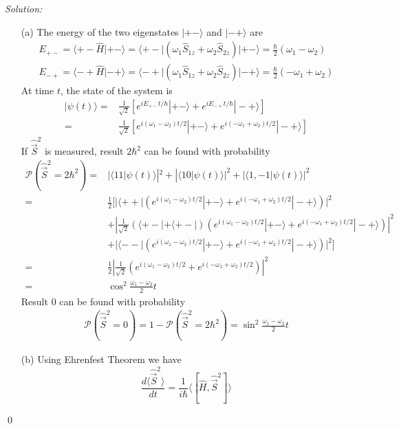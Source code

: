 \documentclass[10pt,a4paper]{article}
\newenvironment{sol}
    {\emph{Solution:}
    }
    {
    \qed
    }
\begin{document}
\begin{sol}
\begin{itemize}
\item[(a)] The energy of the two eigenstates $|+-\rangle$ and $|-+\rangle$ are
\begin{gather}
E_{+-}=\langle+-\hat{H}|+-\rangle=\langle+-|(\omega_1\hat{S}_{1z}+\omega_2\hat{S}_{2z})|+-\rangle=\frac{\hbar}{2}(\omega_1-\omega_2)\\
E_{-+}=\langle-+\hat{H}|-+\rangle=\langle-+|(\omega_1\hat{S}_{1z}+\omega_2\hat{S}_{2z})|-+\rangle=\frac{\hbar}{2}(-\omega_1+\omega_2)
\end{gather}
At time $t$, the state of the system is
\begin{align}
\nonumber|\psi(t)\rangle=&\frac{1}{\sqrt{2}}[e^{iE_{+-}t/\hbar}|+-\rangle+e^{iE_{-+}t/\hbar}|-+\rangle]\\
=&\frac{1}{\sqrt{2}}[e^{i(\omega_1-\omega_2)t/2}|+-\rangle+e^{i(-\omega_1+\omega_2)t/2}|-+\rangle]
\end{align}
If $\hat{\vec{S}}^2$ is measured, result $2\hbar^2$ can be found with probability
\begin{align}
\nonumber\mathscr{P}(\hat{\vec{S}}^2=2\hbar^2)=&|\langle11|\psi(t)\rangle|^2+|\langle10|\psi(t)\rangle|^2+|\langle1,-1|\psi(t)\rangle|^2\\
\nonumber=&\frac{1}{2}[|\langle++|(e^{i(\omega_1-\omega_2)t/2}|+-\rangle+e^{i(-\omega_1+\omega_2)t/2}|-+\rangle)|^2\\
\nonumber&+|\frac{1}{\sqrt{2}}(\langle+-|+\langle+-|)(e^{i(\omega_1-\omega_2)t/2}|+-\rangle+e^{i(-\omega_1+\omega_2)t/2}|-+\rangle)|^2\\
\nonumber&+|\langle--|(e^{i(\omega_1-\omega_2)t/2}|+-\rangle+e^{i(-\omega_1+\omega_2)t/2}|-+\rangle)|^2]\\
\nonumber=&\frac{1}{2}|\frac{1}{\sqrt{2}}(e^{i(\omega_1-\omega_2)t/2}+e^{i(-\omega_1+\omega_2)t/2})|^2\\
=&\cos^2\frac{\omega_1-\omega_2}{2}t
\end{align}
Result $0$ can be found with probability
\begin{align}
\nonumber\mathscr{P}(\hat{\vec{S}}^2=0)=1-\mathscr{P}(\hat{\vec{S}}^2=2\hbar^2)=\sin^2\frac{\omega_1-\omega_2}{2}t
\end{align}
\item[(b)] Using Ehrenfest Theorem we have
\begin{equation}
\frac{d\langle\hat{\vec{S}}^2\rangle}{dt}=\frac{1}{i\hbar}\langle[\hat{H},\hat{\vec{S}}^2]\rangle
\end{equation}

\end{itemize}
\end{sol}
\end{document}
